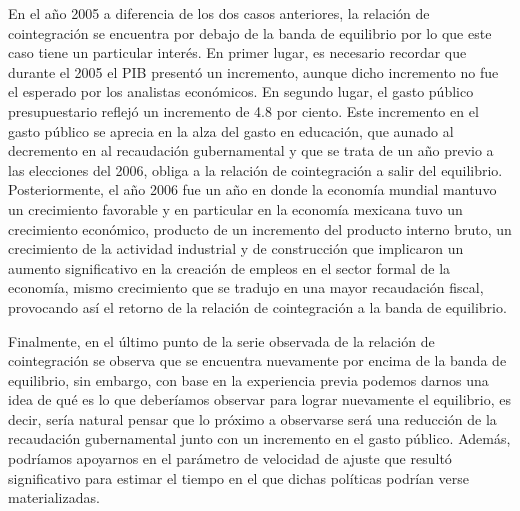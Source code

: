 En el año 2005 a diferencia de los dos casos anteriores, la relación de cointegración se encuentra por debajo de la banda de equilibrio por lo que este caso tiene un particular interés. En primer lugar,  es necesario recordar que durante el 2005 el PIB presentó un incremento, aunque dicho incremento no fue el esperado por los analistas económicos. En segundo lugar, el gasto público presupuestario reflejó un incremento de 4.8 por ciento. Este incremento en el gasto público se aprecia en la alza del gasto en educación, que aunado al decremento en al recaudación gubernamental y que se trata de un año previo a las elecciones del 2006, obliga a la relación de cointegración a salir del equilibrio. Posteriormente, el año 2006 fue un año en donde la economía mundial mantuvo un crecimiento favorable y en particular en la economía mexicana tuvo un crecimiento económico, producto de un incremento del producto interno bruto, un crecimiento de la actividad industrial y de construcción que implicaron un aumento significativo en la creación de empleos en el sector formal de la economía, mismo crecimiento que se tradujo en una mayor recaudación fiscal, provocando así el retorno de la relación de cointegración a la banda de equilibrio.\bigskip


Finalmente, en el último punto de la serie observada de la relación de cointegración se observa que se encuentra nuevamente por encima de la banda de equilibrio, sin embargo, con base en la experiencia previa podemos darnos una idea de qué es lo que deberíamos observar para lograr nuevamente el equilibrio, es decir, sería natural pensar que lo próximo a observarse será una reducción de la recaudación gubernamental junto con un incremento en el gasto público. Además, podríamos apoyarnos en el parámetro de velocidad de ajuste que resultó significativo para estimar el tiempo en el que dichas políticas podrían verse materializadas. \bigskip








